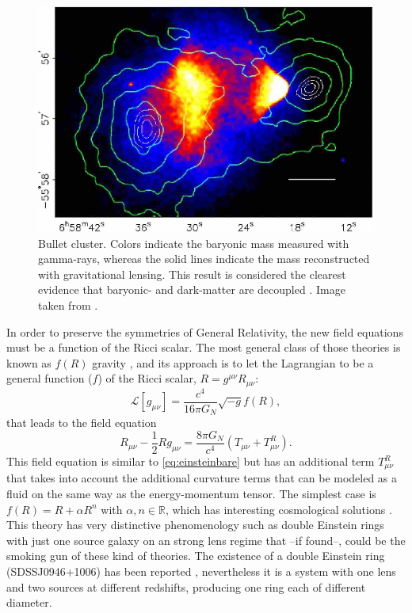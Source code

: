 \begin{figure}
\includegraphics[width=\textwidth]{./Pictures/bullet_cluster.png}
\caption{Bullet cluster. Colors indicate the baryonic mass measured with gamma-rays, whereas the solid lines indicate the mass reconstructed with gravitational lensing. This result is considered the clearest evidence that baryonic- and dark-matter are decoupled . Image taken from \cite{2008PhRvD..78j4004D}.}
\label{fig:bullet}
\end{figure}

In order to preserve the symmetries of General Relativity, the new field equations must be a function of the Ricci scalar. The most general class of those theories is known as $f(R)$ gravity \cite{2010LRR....13....3D,2010RvMP...82..451S}, and its approach is to let the Lagrangian to be a general function ($f$) of the Ricci scalar, $R=g^{\mu\nu}R_{\mu\nu}$:
\begin{equation}
\mathcal{L}[g_{\mu\nu}] = \frac{c^4}{16\pi G_N}\sqrt{-g}f(R),
\end{equation}
that leads to the field equation
\begin{equation}
R_{\mu\nu}-\frac{1}{2}Rg_{\mu\nu}=\frac{8\pi G_N}{c^4}( T_{\mu\nu}+T_{\mu\nu}^R).
\end{equation}
This field equation is similar to \autoref{eq:einsteinbare} but has an additional term $T_{\mu\nu}^R$ that takes into account the additional curvature terms that can be modeled as a fluid on the same way as the energy-momentum tensor. The simplest case is $f(R) =R+\alpha R^n$ with $\alpha,n\in\mathbb{R}$, which has interesting cosmological solutions \cite{PhysRevD.85.083511}. This theory has very distinctive phenomenology such as double Einstein rings with just one source galaxy on an strong lens regime \cite{2011PhRvD..83b4030N} that --if found--, could be the smoking gun of these kind of theories. The existence of a double Einstein ring (SDSSJ0946+1006) has been reported \cite{2008ApJ...677.1046G}, nevertheless it is a system with one lens and two sources at different redshifts, producing one ring each of different diameter.
\newline

